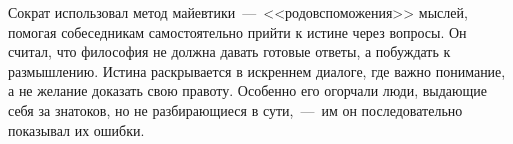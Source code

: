 

Сократ использовал метод майевтики~---~<<родовспоможения>> мыслей, помогая собеседникам самостоятельно прийти к истине через вопросы. Он считал, что философия не должна давать готовые ответы, а побуждать к размышлению. Истина раскрывается в искреннем диалоге, где важно понимание, а не желание доказать свою правоту. Особенно его огорчали люди, выдающие себя за знатоков, но не разбирающиеся в сути,~---~им он последовательно показывал их ошибки.






